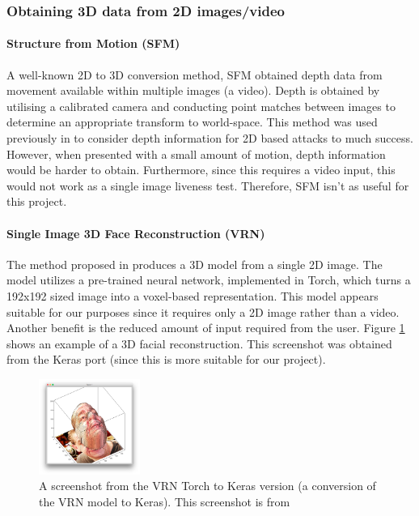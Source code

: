 \documentclass[12pt,a4paper]{article}
\begin{document}
        \cite{3DMadDataset}

        \subsubsection{Obtaining 3D data from 2D images/video}
            
            \paragraph{Structure from Motion (SFM)}
            A well-known 2D to 3D conversion method, SFM obtained depth data from movement available within multiple images (a video). Depth is obtained by utilising a calibrated camera and conducting point matches between images
            to determine an appropriate transform to world-space. This method was used previously in \cite{SFMClassifier} to consider depth information for 2D based attacks to much success.
            However, when presented with a small amount of motion, depth information would be harder to obtain. Furthermore, since this requires a video input, this would not work as a single image liveness test. Therefore, SFM isn't as useful for this project.
            
            \paragraph{Single Image 3D Face Reconstruction (VRN)}
            The method proposed in \cite{3DReconstructionMethod} produces a 3D model from a single 2D image. The model utilizes a pre-trained neural network, implemented in Torch, which turns a 192x192 sized image into a voxel-based representation.
            This model appears suitable for our purposes since it requires only a 2D image rather than a video. Another benefit is the reduced amount of input required from the user. Figure \ref{3DReconstructionScreenshot} shows an example of a 3D facial reconstruction. 
            This screenshot was obtained from the Keras port (since this is more suitable for our project).
            \begin{figure}
                \centering
                \includegraphics[width=125px]{3DReconstructionFromSource}
                \caption{A screenshot from the VRN Torch to Keras version (a conversion of the VRN model to Keras). This screenshot is from \cite{VRNTorchToKeras}}
                \label{3DReconstructionScreenshot}
            \end{figure}
\end{document}
